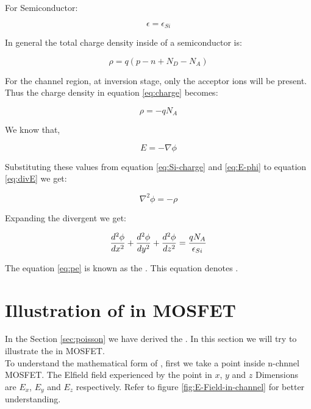 \documentclass[a4paper]{article}
\begin{document}
For Semiconductor:

\begin{equation}
  \epsilon = \epsilon_{Si}
\end{equation}

In general the total charge density inside of a semiconductor is:

\begin{equation}
  \label{eq:charge}
  \rho = q(p - n + N_D - N_A)
\end{equation}

For the channel region, at inversion stage, only the acceptor ions will be present. Thus the charge density in equation \ref{eq:charge} becomes:

\begin{equation}
  \label{eq:Si-charge}
  \rho = - qN_A
\end{equation}

We know that,

\begin{equation}
  \label{eq:E-phi}
  E = - \nabla \mathcal{\phi}
\end{equation}

Substituting these values from equation \ref{eq:Si-charge} and \ref{eq:E-phi} to equation \ref{eq:divE} we get:

\begin{equation}
  \nabla^2 \phi = - \rho
\end{equation}

Expanding the divergent we get:

\begin{equation}
  \label{eq:pe}
  \frac {d^2\phi} {dx^2} + \frac {d^2\phi} {dy^2} + \frac {d^2\phi} {dz^2} = \frac{qN_A} {\epsilon_{Si}}
\end{equation}

The equation \ref{eq:pe} is known as the \PE. This equation denotes \PEstate.

\section{Illustration of \PE in MOSFET}
\label{sec:Poisson-in-MOS}
In the Section \ref{sec:poisson} we have derived the \PE. In this section we will try to illustrate the \PE in MOSFET.\\

To understand the mathematical form of \PE, first we take a point inside n-chnnel MOSFET. The Elfield field experienced by the point in $x$, $y$ and $z$ Dimensions are $E_x$, $E_y$ and $E_z$ respectively. Refer to figure \ref{fig:E-Field-in-channel} for better understanding.
\end{document}
